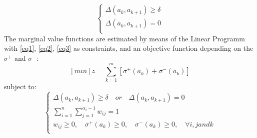 \documentclass{report}
\begin{document}
\begin{equation}\label{eq3}
      \begin{cases}
      	\Delta (a_k, a_{k+1} ) \geq \delta\\
       	\Delta (a_k, a_{k+1} ) = 0 \\
      \end{cases}
\end{equation}
The marginal value functions are estimated by means of the Linear Programm with \eqref{eq1}, \eqref{eq2}, \eqref{eq3} as constraints, and an objective function depending on the $ \sigma^{+}$ and $\sigma^{-} $: 
$$ [min]z = \sum_{k=1}^{m} [ \sigma ^{+} (a_k) + \sigma ^{-} (a_k)]  $$
subject to: 
\begin{equation}\label{eq5}
      \begin{cases}
      	\Delta (a_k, a_{k+1} ) \geq \delta \quad or \quad \Delta (a_k, a_{k+1} ) = 0 \\
      	\sum_{i=1}^{n} \sum_{j=1}^{\alpha_i -1} w_{ij} = 1\\
       	w_{ij} \geq 0, \quad \sigma^{+}(a_k) \geq 0, \quad \sigma^{-}(a_k) \geq 0, \quad  \forall i, j  and  k\\
      \end{cases}
\end{equation}
\end{document}
